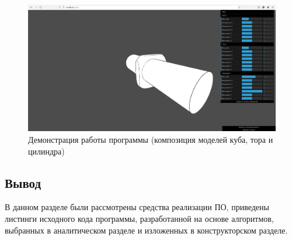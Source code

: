 \begin{figure}[h]
	\centering
	\captionsetup{justification=centering}
	\includegraphics[width=140mm]{img/example-2.png}
	\caption{Демонстрация  работы  программы  (композиция  моделей 
		куба, тора и цилиндра)}
	\label{fig:example-2}
\end{figure}



\subsection*{Вывод}
В данном разделе были рассмотрены средства реализации ПО, приведены 
листинги исходного кода программы, разработанной на основе 
алгоритмов,  выбранных  в  аналитическом  разделе  и  изложенных  в 
конструкторском разделе.

\pagebreak